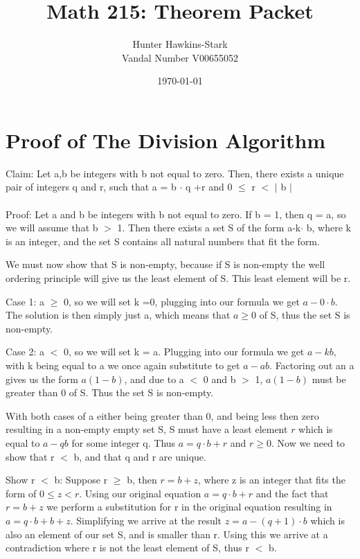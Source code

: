 \documentclass{article}
\title{Math 215: Theorem Packet}
\author{Hunter Hawkins-Stark \\ Vandal Number V00655052}
\date{\today}
\newcommand\tab[1][1cm]{\hspace*{#1}}
\begin{document}
\maketitle

\section{Proof of The Division Algorithm}
Claim: Let a,b be integers with b not equal to zero. Then, there exists a unique pair of integers q and r, such that a = b $\cdot$ q +r and 0 $\leq$ r $<$ $\mid$ b $\mid$ \\\\
Proof: Let a and b be integers with b not equal to zero. If b = 1, then q = a, so we will assume that b $>$ 1. Then there exists a set S of the form a-k$\cdot$ b, where k is an integer, and the set S contains all natural numbers that fit the form.

We must now show that S is non-empty, because if S is non-empty the well ordering principle will give us the least element of S. This least element will be r.  


\tab Case 1: a $\geq$ 0, so we will set k =0, plugging into our formula we get $a-0 \cdot b$. The solution is \tab then simply just a, which means that $a \geq 0 $ of S, thus the set S is non-empty.

\tab Case 2: a $<$ 0, so we will set k = a. Plugging into our formula we get $ a - kb$, with k being equal \tab to a we once again substitute to get $a-ab$. Factoring out an a gives us the form $a(1-b)$, and \tab due to a $<$ 0 and b $>$ 1, $a(1-b)$ must be greater than $0$ of S. Thus the set S is non-empty.


With both cases of a either being greater than 0, and being less then zero resulting in a non-empty empty set S, S must have a least element $r$ which is equal to $a-qb$ for some integer q. Thus $a=q \cdot b+r$ and $r \geq 0 $. Now we need to show that r $<$ b, and that q and r are unique. 


Show r $<$ b: Suppose r $\geq$ b, then $r = b+z$, where z is an integer that fits the form of $0 \leq z < r$. Using our original equation $a = q \cdot b + r$ and the fact that $r = b+z$ we perform a substitution for r in the original equation resulting in $a = q \cdot b + b + z$. Simplifying we arrive at the result  $z  = a - (q+1)\cdot b$ which is also an element of our set S, and is smaller than r. Using this we arrive at a contradiction where r is not the least element of S, thus r $<$ b.
\end{document}
